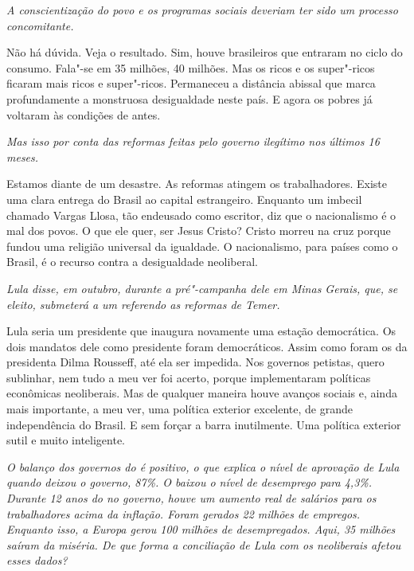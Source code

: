 \itshape
 A conscientização do povo e os programas sociais
deveriam ter sido um processo concomitante.

\normalfont
Não há dúvida. Veja o resultado. Sim, houve brasileiros
que entraram no ciclo do consumo. Fala"-se em 35 milhões, 40 milhões. Mas
os ricos e os super"-ricos ficaram mais ricos e super"-ricos. Permaneceu a
distância abissal que marca profundamente a monstruosa desigualdade
neste país. E agora os pobres já voltaram às condições de antes.

\itshape
 Mas isso por conta das reformas feitas pelo governo
ilegítimo nos últimos 16 meses.

\normalfont
Estamos diante de um desastre. As reformas atingem os
trabalhadores. Existe uma clara entrega do Brasil ao capital
estrangeiro. Enquanto um imbecil chamado Vargas Llosa, tão endeusado
como escritor, diz que o nacionalismo é o mal dos povos. O que ele quer,
ser Jesus Cristo? Cristo morreu na cruz porque fundou uma religião
universal da igualdade. O nacionalismo, para países como o Brasil, é o
recurso contra a desigualdade neoliberal.

\itshape
 Lula disse, em outubro, durante a pré"-campanha dele em
Minas Gerais, que, se eleito, submeterá a um referendo as reformas de
Temer.

\normalfont
Lula seria um presidente que inaugura novamente uma
estação democrática. Os dois mandatos dele como presidente foram
democráticos. Assim como foram os da presidenta Dilma Rousseff, até ela
ser impedida. Nos governos petistas, quero sublinhar, nem tudo a meu ver
foi acerto, porque implementaram políticas econômicas neoliberais. Mas
de qualquer maneira houve avanços sociais e, ainda mais importante, a
meu ver, uma política exterior excelente, de grande independência do
Brasil. E sem forçar a barra inutilmente. Uma política exterior sutil e
muito inteligente.

\itshape
 O balanço dos governos do  é positivo, o que explica
o nível de aprovação de Lula quando deixou o governo, 87\%. O  baixou
o nível de desemprego para 4,3\%. Durante 12 anos do  no governo,
houve um aumento real de salários para os trabalhadores acima da
inflação. Foram gerados 22 milhões de empregos. Enquanto isso, a Europa
gerou 100 milhões de desempregados. Aqui, 35 milhões saíram da miséria.
De que forma a conciliação de Lula com os neoliberais afetou esses
dados?

